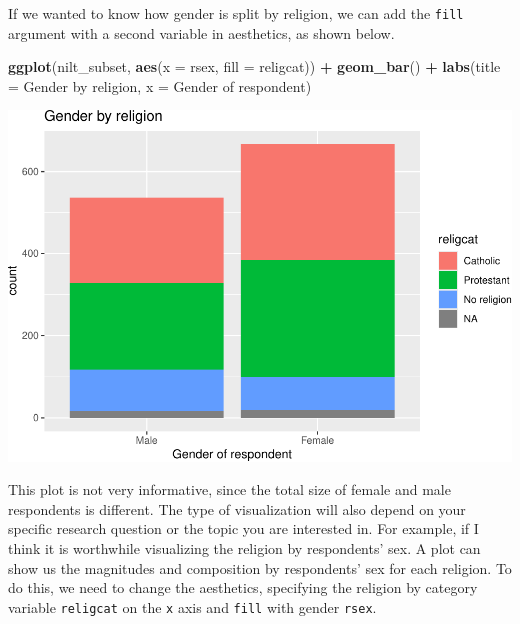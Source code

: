 \documentclass[
]{book}
\newenvironment{Shaded}{\begin{snugshade}}{\end{snugshade}}
\newcommand{\AttributeTok}[1]{\textcolor[rgb]{0.13,0.29,0.53}{#1}}
\newcommand{\FunctionTok}[1]{\textcolor[rgb]{0.13,0.29,0.53}{\textbf{#1}}}
\newcommand{\NormalTok}[1]{#1}
\newcommand{\SpecialCharTok}[1]{\textcolor[rgb]{0.81,0.36,0.00}{\textbf{#1}}}
\newcommand{\StringTok}[1]{\textcolor[rgb]{0.31,0.60,0.02}{#1}}
\begin{document}
If we wanted to know how gender is split by religion, we can add the \texttt{fill} argument with a second variable in aesthetics, as shown below.

\begin{Shaded}
\begin{Highlighting}[]
\FunctionTok{ggplot}\NormalTok{(nilt\_subset, }\FunctionTok{aes}\NormalTok{(}\AttributeTok{x =}\NormalTok{ rsex, }\AttributeTok{fill =}\NormalTok{ religcat)) }\SpecialCharTok{+}
  \FunctionTok{geom\_bar}\NormalTok{() }\SpecialCharTok{+}
  \FunctionTok{labs}\NormalTok{(}\AttributeTok{title =} \StringTok{\textquotesingle{}Gender by religion\textquotesingle{}}\NormalTok{, }\AttributeTok{x =} \StringTok{\textquotesingle{}Gender of respondent\textquotesingle{}}\NormalTok{)}
\end{Highlighting}
\end{Shaded}

\begin{flushleft}\includegraphics[width=1\linewidth]{lab-workbook_files/figure-latex/unnamed-chunk-66-1} \end{flushleft}

This plot is not very informative, since the total size of female and male respondents is different. The type of visualization will also depend on your specific research question or the topic you are interested in. For example, if I think it is worthwhile visualizing the religion by respondents' sex. A plot can show us the magnitudes and composition by respondents' sex for each religion. To do this, we need to change the aesthetics, specifying the religion by category variable \texttt{religcat} on the \texttt{x} axis and \texttt{fill} with gender \texttt{rsex}.
\end{document}
